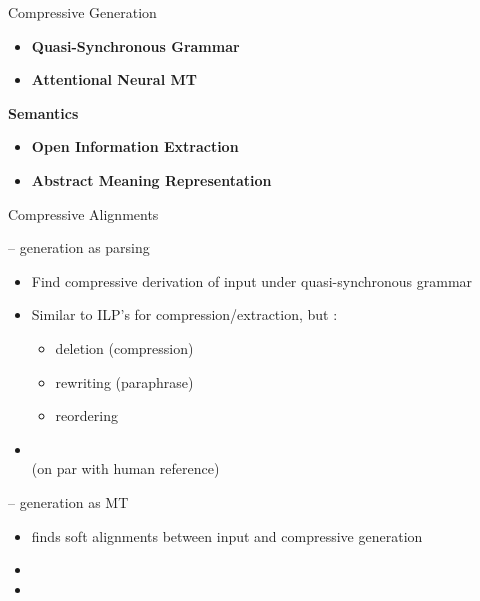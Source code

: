\documentclass[xcolor={table}]{beamer}
\begin{document}
\begin{frame}{Compressive Generation}

    \begin{itemize}
\item \textbf{Quasi-Synchronous Grammar} 
    {\tiny \cite{woodsend2010generation}}
\item \textbf{Attentional Neural MT}
    {\tiny \cite{rush2015neural}}
    \end{itemize}


\textbf{Semantics}
    \begin{itemize}
\item \textbf{Open Information Extraction} 
    {\tiny \cite{pighin2014modelling}}
\item \textbf{Abstract Meaning Representation} 
    {\tiny \cite{liu2015toward}}
    \end{itemize}

\end{frame}
    
    
\begin{frame}{Compressive Alignments}

    \textbf{\cite{woodsend2010generation}} -- generation as parsing
    \begin{itemize}
            \small
    \item Find compressive derivation of input under quasi-synchronous 
        grammar 
    \item Similar to ILP's for compression/extraction, but 
        :
       \begin{itemize}
           \item deletion (compression)
           \item rewriting (paraphrase)
           \item reordering 
       \end{itemize}
   \item {}
       \\
       (on par with human reference)
    \end{itemize}

    \textbf{\cite{rush2015neural}} -- generation as MT
    \begin{itemize}
            \small
        \item finds soft alignments between input and compressive generation
        \item {}
        \item {}
    \end{itemize}
\end{frame}
\end{document}
